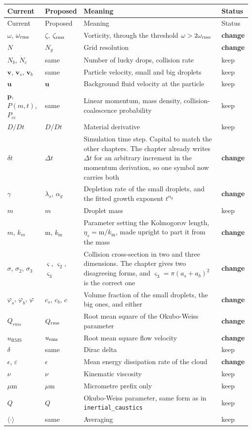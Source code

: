 \documentclass[11pt,a4paper]{article}
\renewcommand{\vec}[1]{\boldsymbol{#1}}
\newcommand{\chg}{\textbf{change}}
\newcommand{\kp}{keep}
\begin{document}
\begin{longtable}{@{}p{3.1cm} p{3.1cm} p{8.6cm} p{1.6cm}@{}}
\toprule
Current & Proposed & Meaning & Status \\
\midrule
\endfirsthead
\toprule
Current & Proposed & Meaning & Status \\
\midrule
\endhead
$\omega$, $\omega_{\rm rms}$ & $\zeta$, $\zeta_{\rm rms}$ & Vorticity, through the threshold $\omega > 2\omega_{\rm rms}$ & \chg \\
$N$ & $N_g$ & Grid resolution & \chg \\
$N_b$, $\dot{N}_c$ & same & Number of lucky drops, collision rate & \kp \\
$\vec{v}$, $\vec{v}_s$, $\vec{v}_b$ & same & Particle velocity, small and big droplets & \kp \\
$\vec{u}$ & $\vec{u}$ & Background fluid velocity at the particle & \kp \\
$\vec{p}$, $P(m,t)$, $P_{cc}$ & same & Linear momentum, mass density, collision-coalescence probability & \kp \\
$D/Dt$ & $D/Dt$ & Material derivative & \kp \\
$\delta t$ & $\Delta t$ & Simulation time step. Capital to match the other chapters. The chapter already writes $\Delta t$ for an arbitrary increment in the momentum derivation, so one symbol now carries both & \chg \\
$\gamma$ & $\lambda_s$, $\alpha_g$ & Depletion rate of the small droplets, and the fitted growth exponent $t^{\alpha_g}$ & \chg \\
$m$ & $m$ & Droplet mass & \kp \\
$m$, $k_m$ & $\mathrm{m}$, $k_{\mathrm{m}}$ & Parameter setting the Kolmogorov length, $\eta_s = \mathrm{m}/k_{\mathrm{m}}$, made upright to part it from the mass & \chg \\
$\sigma$, $\sigma_2$, $\sigma_3$ & $\varsigma$, $\varsigma_2$, $\varsigma_3$ & Collision cross-section in two and three dimensions. The chapter gives two disagreeing forms, and $\varsigma_3 = \pi(a_s+a_b)^2$ is the correct one & \chg \\
$\varphi_s$, $\varphi_b$, $\varphi$ & $c_s$, $c_b$, $c$ & Volume fraction of the small droplets, the big ones, and either & \chg \\
$Q_{rms}$ & $Q_{\rm rms}$ & Root mean square of the Okubo-Weiss parameter & \chg \\
$u_{\text{RMS}}$ & $u_{\rm rms}$ & Root mean square flow velocity & \chg \\
$\delta$ & same & Dirac delta & \kp \\
$\epsilon$, $\varepsilon$ & $\epsilon$ & Mean energy dissipation rate of the cloud & \chg \\
$\nu$ & $\nu$ & Kinematic viscosity & \kp \\
$\mu$m & $\mu$m & Micrometre prefix only & \kp \\
$Q$ & $Q$ & Okubo-Weiss parameter, same form as in \texttt{inertial\_caustics} & \kp \\
$\langle\cdot\rangle$ & same & Averaging & \kp \\
\bottomrule
\end{longtable}
\end{document}
